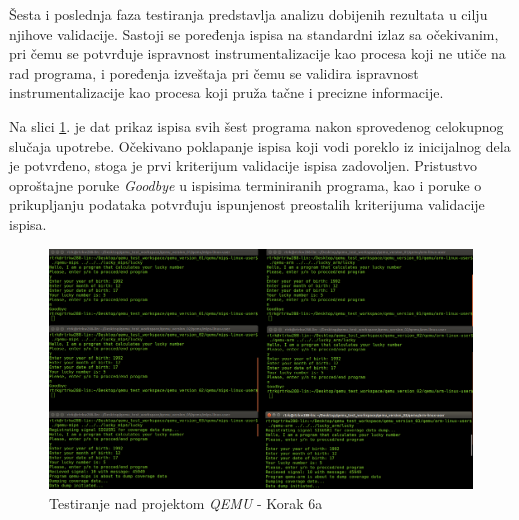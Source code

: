 \documentclass[12pt,oneside]{memoir}
\newcommand{\strano}[1]{\textit{#1}}
\begin{document}
Šesta i poslednja faza testiranja predstavlja analizu dobijenih rezultata u cilju njihove validacije. Sastoji se poređenja ispisa na standardni izlaz sa očekivanim, pri čemu se potvrđuje ispravnost instrumentalizacije kao procesa koji ne utiče na rad programa, i  poređenja izveštaja pri čemu se validira ispravnost instrumentalizacije kao procesa koji pruža tačne i precizne informacije. 

Na slici \ref{fig:qemu-test-6a}. je dat prikaz ispisa svih šest programa nakon sprovedenog celokupnog slučaja upotrebe. Očekivano poklapanje ispisa koji vodi poreklo iz inicijalnog dela je potvrđeno, stoga je prvi kriterijum validacije ispisa zadovoljen. Pristustvo oproštajne poruke \strano{Goodbye} u ispisima terminiranih programa, kao i poruke o prikupljanju podataka
potvrđuju ispunjenost preostalih kriterijuma validacije ispisa.

\begin{figure}[!ht]
  \centering
  \includegraphics[width=\textwidth]{img/qemu-test-6a.png}
  \caption{Testiranje nad projektom \strano{QEMU} - Korak 6a}
  \label{fig:qemu-test-6a}
\end{figure} 
\end{document}

